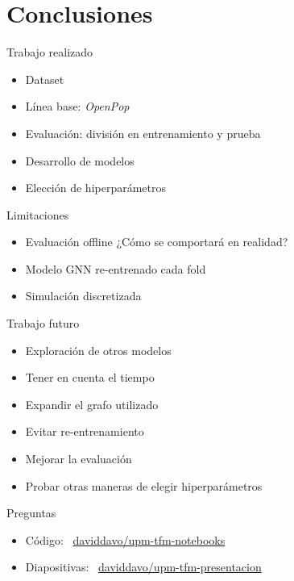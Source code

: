 \section{Conclusiones}

\begin{frame}{Trabajo realizado}
    \begin{itemize}
        \item Dataset
        \item Línea base: \textit{OpenPop}
        \item Evaluación: división en entrenamiento y prueba
        \item Desarrollo de modelos
        \item Elección de hiperparámetros
    \end{itemize}
\end{frame}

\begin{frame}{Limitaciones}
    \begin{itemize}
        \item Evaluación offline \textrightarrow ¿Cómo se comportará en realidad?
        \item Modelo GNN re-entrenado cada fold
        \item Simulación discretizada
    \end{itemize} 
\end{frame}

\begin{frame}{Trabajo futuro}
    \begin{itemize}
        \item Exploración de otros modelos
        \item Tener en cuenta el tiempo
        \item Expandir el grafo utilizado
        \item Evitar re-entrenamiento
        \item Mejorar la evaluación
        \item Probar otras maneras de elegir hiperparámetros
    \end{itemize}
\end{frame}

\begingroup
{}
\begin{frame}{Preguntas}
    \vfill
    \begin{itemize}
        \item Código: \faGithub\ \href{https://github.com/daviddavo/upm-tfm-notebooks}{daviddavo/upm-tfm-notebooks}
        \item Diapositivas: \faGithub\ \href{https://github.com/daviddavo/upm-tfm-presentacion}{daviddavo/upm-tfm-presentacion}
    \end{itemize}
    \vfill
    \vspace{25mm}
    \doclicenseThis
\end{frame}
\endgroup
